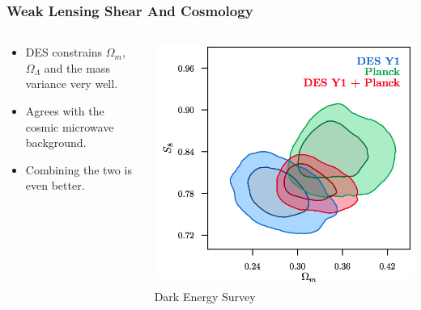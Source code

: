 \documentclass{beamer}
\begin{document}
\frame
{

    \frametitle{Weak Lensing Shear And Cosmology}


    \begin{columns}
        \begin{column}{0.5\textwidth}
            \begin{itemize}

                \item DES constrains {\color{gold} $\Omega_m$}, {\color{gold} $\Omega_\Lambda$}
                    and the mass variance very well.

                \item Agrees with the cosmic microwave background.
                    
                \item Combining the two is even better.

            \end{itemize}

        \end{column}
        \begin{column}{0.5\textwidth}
            \begin{center}
                \includegraphics[width=\textwidth]{3x2-fig10.png}
                \newline
                {\tiny Dark Energy Survey}
            \end{center}
        \end{column}

    \end{columns}


}
\end{document}

